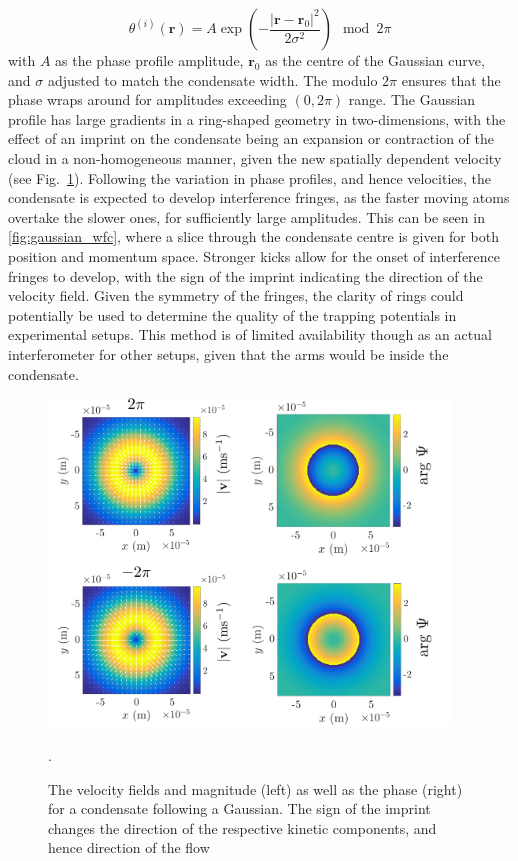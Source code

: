\begin{equation}
    \theta^{(i)}(\mathbf{r}) = A\exp\left( -\frac{ |\mathbf{r}-\mathbf{r}_0|^2 }{2\sigma^2 } \right) \mod 2\pi
\end{equation}
with $A$ as the phase profile amplitude, $\mathbf{r}_0$ as the centre of the Gaussian curve, and $\sigma$ adjusted to match the condensate width. The modulo $2\pi$ ensures that the phase wraps around for amplitudes exceeding $(0,2\pi)$ range. The Gaussian profile has large gradients in a ring-shaped geometry in two-dimensions, with the effect of an imprint on the condensate being an expansion or contraction of the cloud in a non-homogeneous manner, given the new spatially dependent velocity (see Fig.~\ref{fig:gaussian}). Following the variation in phase profiles, and hence velocities, the condensate is expected to develop interference fringes, as the faster moving atoms overtake the slower ones, for sufficiently large amplitudes. This can be seen in \ref{fig:gaussian_wfc}, where a slice through the condensate centre is given for both position and momentum space. Stronger kicks allow for the onset of interference fringes to develop, with the sign of the imprint indicating the direction of the velocity field. Given the symmetry of the fringes, the clarity of rings could potentially be used to determine the quality of the trapping potentials in experimental setups. This method is of limited availability though as an actual interferometer for other setups, given that the arms would be inside the condensate.

\begin{figure}\centering
    \includegraphics[width=0.95\textwidth]{Images/ch4_vtx/velocity/gaussian_imprint}
    \caption{The velocity fields and magnitude (left) as well as the phase (right) for a condensate following a Gaussian. The sign of the imprint changes the direction of the respective kinetic components, and hence direction of the flow}.\label{fig:gaussian}
\end{figure}


